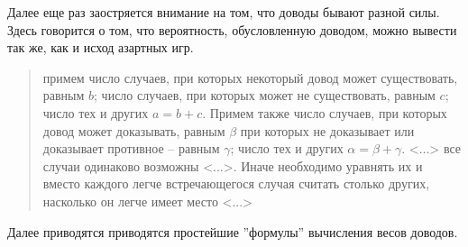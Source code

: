 \documentclass[12pt]{article}
\begin{document}
Далее еще раз заостряется внимание на том, что доводы бывают разной силы.
Здесь говорится о том, что вероятность, обусловленную доводом, можно вывести так же, как и исход азартных игр.
\begin{quote}
примем число случаев, при которых некоторый довод может существовать, равным $b$; число случаев, при которых может не существовать, равным $c$; число тех и других $a=b+c$.
Примем также число случаев, при которых довод может доказывать, равным $\beta$ при которых не доказывает или доказывает противное -- равным $\gamma$; число тех и других $\alpha = \beta + \gamma$. 
<...> все случаи одинаково возможны <...>. Иначе необходимо уравнять их и вместо каждого легче встречающегося случая считать столько других, насколько он легче имеет место <...>
\end{quote}
Далее приводятся приводятся простейшие ''формулы'' вычисления весов доводов.
\end{document}

